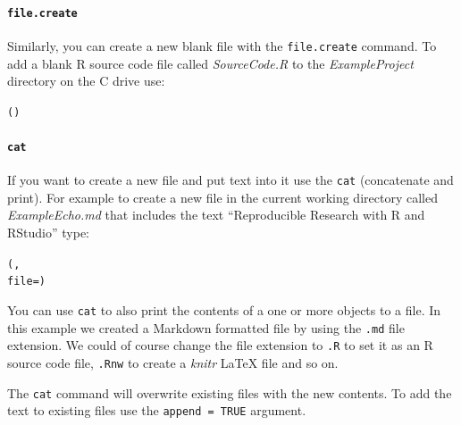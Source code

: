 \documentclass[krantz1]{krantz}
\begin{document}
\paragraph{{\tt{file.create}}}

Similarly, you can create a new blank file with the \texttt{file.create} command. To add a blank R source code file called {\emph{SourceCode.R}} to the {\emph{ExampleProject}} directory on the C drive use:

\begin{knitrout}
\color{fgcolor}\begin{kframe}
\begin{alltt}
()
\end{alltt}
\end{kframe}
\end{knitrout}


\paragraph{{\tt{cat}}}\label{catR}

If you want to create a new file and put text into it use the \texttt{cat} (concatenate and print). For example to create a new file in the current working directory called \emph{ExampleEcho.md} that includes the text ``Reproducible Research with R and RStudio'' type:

\begin{knitrout}
\color{fgcolor}\begin{kframe}
\begin{alltt}
(,
    file = )
\end{alltt}
\end{kframe}
\end{knitrout}


\noindent You can use \texttt{cat} to also print the contents of a one or more objects to a file. In this example we created a Markdown formatted file by using the \texttt{.md} file extension. We could of course change the file extension to \texttt{.R} to set it as an R source code file, \texttt{.Rnw} to create a \emph{knitr} LaTeX file and so on.

The \texttt{cat} command will overwrite existing files with the new contents. To add the text to existing files use the \texttt{append = TRUE} argument.
\end{document}
